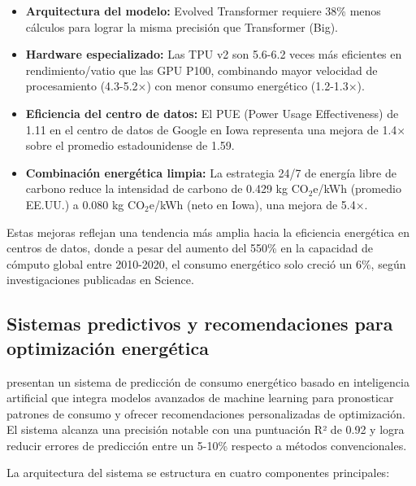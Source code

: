 \begin{itemize}
    \item \textbf{Arquitectura del modelo:} Evolved Transformer requiere 38\% menos cálculos para lograr la misma precisión que Transformer (Big).
    
    \item \textbf{Hardware especializado:} Las TPU v2 son 5.6-6.2 veces más eficientes en rendimiento/vatio que las GPU P100, combinando mayor velocidad de procesamiento (4.3-5.2×) con menor consumo energético (1.2-1.3×).
    
    \item \textbf{Eficiencia del centro de datos:} El PUE (Power Usage Effectiveness) de 1.11 en el centro de datos de Google en Iowa representa una mejora de 1.4× sobre el promedio estadounidense de 1.59.
    
    \item \textbf{Combinación energética limpia:} La estrategia 24/7 de energía libre de carbono reduce la intensidad de carbono de 0.429 kg CO$_2$e/kWh (promedio EE.UU.) a 0.080 kg CO$_2$e/kWh (neto en Iowa), una mejora de 5.4×.
\end{itemize}

Estas mejoras reflejan una tendencia más amplia hacia la eficiencia energética en centros de datos, donde a pesar del aumento del 550\% en la capacidad de cómputo global entre 2010-2020, el consumo energético solo creció un 6\%, según investigaciones publicadas en Science.

\subsection{Sistemas predictivos y recomendaciones para optimización energética}

\textcite{girija2024ai} presentan un sistema de predicción de consumo energético basado en inteligencia artificial que integra modelos avanzados de machine learning para pronosticar patrones de consumo y ofrecer recomendaciones personalizadas de optimización. El sistema alcanza una precisión notable con una puntuación R² de 0.92 y logra reducir errores de predicción entre un 5-10\% respecto a métodos convencionales. 

La arquitectura del sistema se estructura en cuatro componentes principales:

